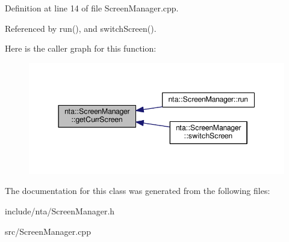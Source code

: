 Definition at line 14 of file Screen\+Manager.\+cpp.



Referenced by run(), and switch\+Screen().

Here is the caller graph for this function\+:
\nopagebreak
\begin{figure}[H]
\begin{center}
\leavevmode
\includegraphics[width=344pt]{d0/dc4/classnta_1_1ScreenManager_a4b26e8adc481bfb37a088e047e4ccc2a_icgraph}
\end{center}
\end{figure}


The documentation for this class was generated from the following files\+:\begin{DoxyCompactItemize}
\item 
include/nta/Screen\+Manager.\+h\item 
src/Screen\+Manager.\+cpp\end{DoxyCompactItemize}
